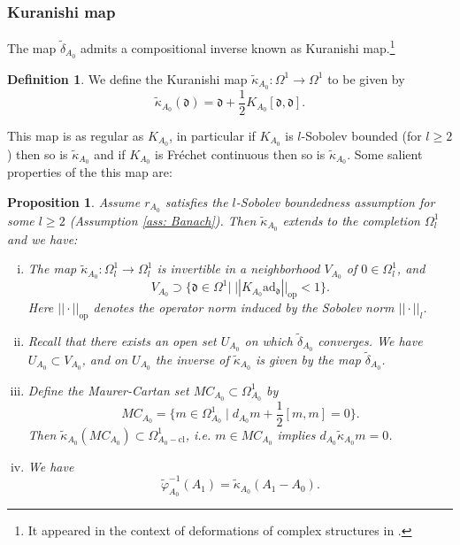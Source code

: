 \documentclass[11pt,a4paper]{amsart}
\theoremstyle{plain} %
\newtheorem{prop}[thm]{Proposition}
\theoremstyle{definition}
\newtheorem{defn}[thm]{Definition}
\theoremstyle{remark}
\newcommand{\dd}{d}
\newcommand{\mr}{\mathrm}
\newcommand{\til}{\widetilde}
\newcommand{\ddd}{\mathfrak{d}}
\begin{document}
 \subsubsection{Kuranishi map}
The map $\til\delta_{A_0}$ admits a compositional inverse known as Kuranishi map.\footnote{It appeared in the context of deformations of complex structures in \cite{Kuranishi1965}. }
\begin{defn}
    We define the Kuranishi map $\til{\kappa}_{A_0}\colon \Omega^1 \to \Omega^1$ to be given by 
\begin{equation}
 \til{\kappa}_{A_0}(\ddd) = \ddd + \frac{1}{2}K_{A_0}[\ddd,\ddd] \label{eq: kuranishi map}.
\end{equation}
\end{defn}
This map is as regular as $K_{A_0}$, in particular if $K_{A_0}$ is $l$-Sobolev bounded (for $l \geq 2$) then so is $\til\kappa_{A_0}$ and if $K_{A_0}$ is Fr\'echet continuous then so is $\til{\kappa}_{A_0}$.
Some salient properties of the this map are:
\begin{prop}\label{prop: kuranishi} Assume $r_{A_0}$ satisfies the $l$-Sobolev boundedness assumption for some $l \geq 2$ (Assumption \ref{ass: Banach}). Then $\til{\kappa}_{A_0}$ extends to the completion $\Omega^1_l$ and we have: %
\begin{enumerate}[i)]
    \item The map $\til{\kappa}_{A_0} \colon \Omega^1_l \to \Omega^1_l$ is invertible in a neighborhood $V_{A_0}$ of $ 0\in \Omega^1_l$, and 
     $$V_{A_0} \supset \{\ddd \in \Omega^1|\; ||K_{A_0}\mathrm{ad}_\ddd||_\mr{op} < 1\}. $$
     Here $||\cdot||_\mr{op}$ denotes the operator norm induced by the Sobolev norm $||\cdot||_l$.
    \item 
    Recall that there exists an open set $U_{A_0}$ on which $\til{\delta}_{A_0}$ converges. We have $U_{A_0} \subset V_{A_0}$, and on $U_{A_0}$ the inverse of $\til{\kappa}_{A_0}$ is given by the map $\til{\delta}_{A_0}$. 
    \item Define the Maurer-Cartan set $MC_{A_0} \subset \Omega^1_{A_0}$ by 
    \begin{equation}
        MC_{A_0} = \{m \in \Omega^1_{A_0} \;|\; \dd_{A_0}m + \frac12[m,m] = 0\}.
    \end{equation}
    Then $\til{\kappa}_{A_0}(MC_{A_0}) \subset \Omega^1_{A_0-\mr{cl}}$, i.e. $m \in MC_{A_0}$ implies $\dd_{A_0}\til\kappa_{A_0} m = 0$.
    \item We have
    \begin{equation}
        \til{\varphi}_{A_0}^{-1}(A_1) = \til\kappa_{A_0}(A_1-A_0).\label{eq: til phi inverse}
    \end{equation}
\end{enumerate}
\end{prop} 
\end{document}
